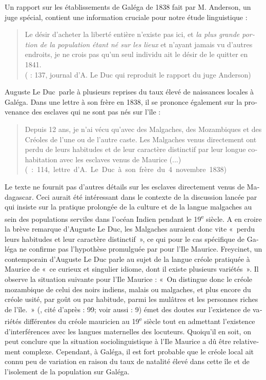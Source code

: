 \documentclass[output=paper]{langscibook}
\begin{document}
\begin{otherlanguage}{french}
Un rapport sur les établissements de Galéga de 1838 fait par M. Anderson, un juge spécial, contient une information cruciale pour notre étude linguistique :

\begin{quote}
Le désir d’acheter la liberté entière n’existe pas ici, et \textit{la plus grande portion de la population étant né sur les lieux} et n’ayant jamais vu d’autres endroits, je ne crois pas qu’un seul individu ait le désir de le quitter en 1841.
\smallskip\\(\citealt{Pourcelet1994} : 137, journal d’A. Le Duc qui reproduit le rapport du juge Anderson)
\end{quote}

Auguste Le Duc~parle à plusieurs reprises du taux élevé de naissances locales à Galéga. Dans une lettre à son frère en 1838, il se prononce également sur la provenance des esclaves qui ne sont pas nés sur l’île :

\begin{quote}
Depuis 12 ans, je n’ai vécu qu’avec des Malgaches, des Mozambiques et des Créoles de l’une ou de l’autre caste. Les Malgaches venus directement ont perdu de leurs habitudes et de leur caractère distinctif par leur longue cohabitation avec les esclaves venus de Maurice (...)\\\hbox{}\hfill\hbox{(\citealt{Pourcelet1994} : 114, lettre d’A. Le Duc à son frère du 4 novembre 1838)}
\end{quote}

Le texte ne fournit pas d’autres détails sur les esclaves directement venus de Madagascar. Ceci aurait été intéressant dans le contexte de la discussion lancée par \citet{Larson2009} qui insiste sur la pratique prolongée de la culture et de la langue malgaches au sein des populations serviles dans l’océan Indien pendant le 19\textsuperscript{e} siècle. A en croire la brève remarque d’Auguste Le Duc, les Malgaches auraient donc vite «~perdu leurs habitudes et leur caractère distinctif~», ce qui pour le cas spécifique de Galéga ne confirme pas l’hypothèse promulguée par \citet{Larson2009} pour l’Ile Maurice. Freycinet, un contemporain d’Auguste Le Duc parle au sujet de la langue créole pratiquée à Maurice de «~ce curieux et singulier idiome, dont il existe plusieurs variétés~». Il observe la situation suivante pour l’Ile Maurice : «~On distingue donc le créole mozambique de celui des noirs indiens, malais ou malgaches, et plus encore du créole usité, par goût ou par habitude, parmi les mulâtres et les personnes riches de l’île.~» (\citealt{Freycinet1827}, cité d’après \citealt{Chaudenson1981} : 99; voir aussi \citealt{BakerEtAl2007} : 9) \citet[161]{Chaudenson1981} émet des doutes sur l’existence de variétés différentes du créole mauricien au 19\textsuperscript{e} siècle tout en admettant l’existence d’interférences avec les langues maternelles des locuteurs. Quoiqu’il en soit, on peut conclure que la situation sociolinguistique à l’Ile Maurice a dû être relativement complexe. Cependant, à Galéga, il est fort probable que le créole local ait connu peu de variation en raison du taux de natalité élevé dans cette île et de l’isolement de la population sur Galéga. 


\end{otherlanguage}
\end{document}
